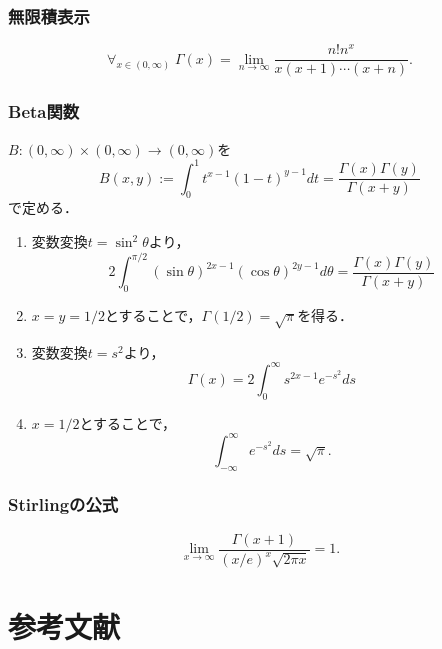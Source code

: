 \documentclass[uplatex, dvipdfmx]{jsreport}
\begin{document}
\subsection{無限積表示}

\begin{proposition}[無限積表示]
    \[\forall_{x\in(0,\infty)}\;\Gamma(x)=\lim_{n\to\infty}\frac{n!n^x}{x(x+1)\cdots (x+n)}.\]
\end{proposition}

\subsection{Beta関数}

\begin{definition}
    $B:(0,\infty)\times(0,\infty)\to(0,\infty)$を
    \[B(x,y):=\int^1_0t^{x-1}(1-t)^{y-1}dt=\frac{\Gamma(x)\Gamma(y)}{\Gamma(x+y)}\]
    で定める．
\end{definition}

\begin{corollary}\mbox{}
    \begin{enumerate}
        \item 変数変換$t=\sin^2\theta$より，
        \[2\int^{\pi/2}_0(\sin\theta)^{2x-1}(\cos\theta)^{2y-1}d\theta=\frac{\Gamma(x)\Gamma(y)}{\Gamma(x+y)}\]
        \item $x=y=1/2$とすることで，$\Gamma(1/2)=\sqrt{\pi}$を得る．
        \item 変数変換$t=s^2$より，
        \[\Gamma(x)=2\int^\infty_0s^{2x-1}e^{-s^2}ds\]
        \item $x=1/2$とすることで，
        \[\int^\infty_{-\infty}e^{-s^2}ds=\sqrt{\pi}.\]
    \end{enumerate}
\end{corollary}

\subsection{Stirlingの公式}

\begin{theorem}[Stirlingの公式]
    \[\lim_{x\to\infty}\frac{\Gamma(x+1)}{(x/e)^x\sqrt{2\pi x}}=1.\]
\end{theorem}

\chapter{参考文献}


\end{document}
